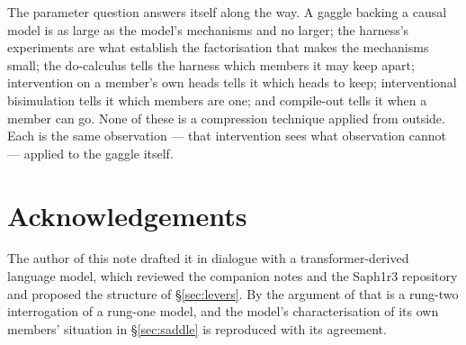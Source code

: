 \documentclass[11pt]{article}
\theoremstyle{plain}
\theoremstyle{definition}
\theoremstyle{remark}
\begin{document}
The parameter question answers itself along the way. A gaggle backing a causal
model is as large as the model's mechanisms and no larger; the harness's
experiments are what establish the factorisation that makes the mechanisms
small; the do-calculus tells the harness which members it may keep apart;
intervention on a member's own heads tells it which heads to keep; interventional
bisimulation tells it which members are one; and compile-out tells it when a
member can go. None of these is a compression technique applied from outside.
Each is the same observation --- that intervention sees what observation cannot
--- applied to the gaggle itself.

\section*{Acknowledgements}

The author of this note drafted it in dialogue with a transformer-derived
language model, which reviewed the companion notes and the Saph1r3 repository
and proposed the structure of \S\ref{sec:levers}. By the argument of
\cite[\S5]{Inhabiting} that is a rung-two interrogation of a rung-one model,
and the model's characterisation of its own members' situation in
\S\ref{sec:saddle} is reproduced with its agreement.
\end{document}
